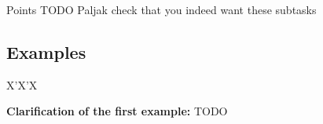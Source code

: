 \begin{statement}[
  problempoints=100,
  timelimit=1 second,
  memorylimit=1024 MiB,
]{Points}
TODO Paljak check that you indeed want these subtasks

\subsection*{Examples}
\begin{tabularx}{\textwidth}{X'X'X}
\end{tabularx}

\textbf{Clarification of the first example:}
TODO

\end{statement}


